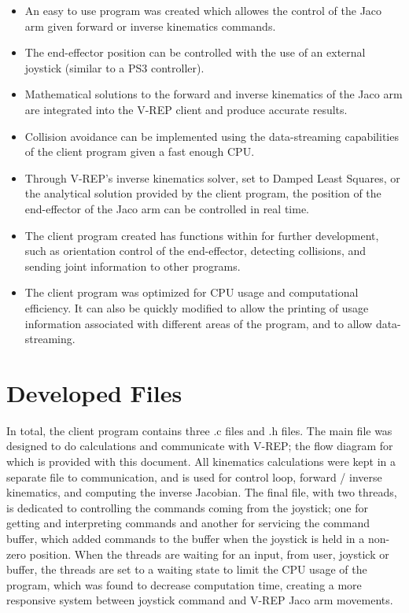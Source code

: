 \documentclass[12pt,openany,a4paper]{book}
\begin{document}
\begin{itemize}
	\item An easy to use program was created which allowes the control of the Jaco arm given forward or inverse kinematics commands.
	\item The end-effector position can be controlled with the use of an external joystick (similar to a PS3 controller).
	\item Mathematical solutions to the forward and inverse kinematics of the Jaco arm are integrated into the V-REP client and produce accurate results.
	\item Collision avoidance can be implemented using the data-streaming capabilities of the client program given a fast enough CPU.
	\item Through V-REP's inverse kinematics solver, set to Damped Least Squares, or the analytical solution provided by the client program, the position of the end-effector of the Jaco arm can be controlled in real time.
	\item The client program created has functions within for further development, such as orientation control of the end-effector, detecting collisions, and sending joint information to other programs.
	\item The client program was optimized for CPU usage and computational efficiency. It can also be quickly modified to allow the printing of usage information associated with different areas of the program, and to allow data-streaming.
\end{itemize}


\section{Developed Files}

In total, the client program contains three .c files and .h files. The main file was designed to do calculations and communicate with V-REP; the flow diagram for which is provided with this document. All kinematics calculations were kept in a separate file to communication, and is used for control loop, forward / inverse kinematics, and computing the inverse Jacobian. The final file, with two threads, is dedicated to controlling the commands coming from the joystick; one for getting and interpreting commands and another for servicing the command buffer, which added commands to the buffer when the joystick is held in a non-zero position. When the threads are waiting for an input, from user, joystick or buffer, the threads are set to a waiting state to limit the CPU usage of the program, which was found to decrease computation time, creating a more responsive system between joystick command and V-REP Jaco arm movements.
\end{document}

